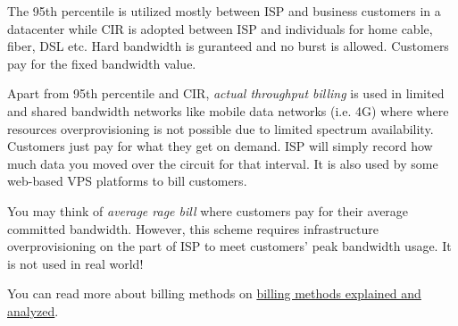 The 95th percentile is utilized mostly between ISP and business
customers in a datacenter while CIR is adopted between ISP and
individuals for home cable, fiber, DSL etc. Hard bandwidth is
guranteed and no burst is allowed. Customers pay for the fixed
bandwidth value.

Apart from 95th percentile and CIR, \textit{actual throughput
  billing} is used in limited and shared bandwidth networks like
mobile data networks (i.e. 4G) where where resources
overprovisioning is not possible due to limited spectrum
availability. Customers just pay for what they get on demand. ISP
will simply record how much data you moved over the circuit for
that interval. It is also used by some web-based VPS platforms to
bill customers.

You may think of \textit{average rage bill} where customers pay
for their average committed bandwidth. However, this scheme
requires infrastructure overprovisioning on the part of ISP to
meet customers' peak bandwidth usage. It is not used in real
world!

You can read more about billing methods on
\href{https://www.semaphore.com/95th-percentile-bandwidth-metering-explained-and-analyzed/}{billing
  methods explained and analyzed}.

